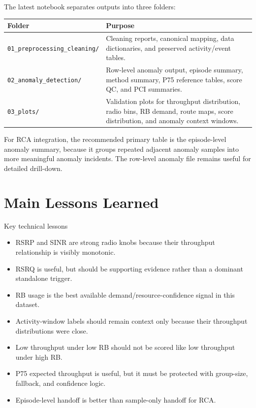 \documentclass[12pt,a4paper]{article}
\newcommand{\fname}[1]{\texttt{#1}}
\begin{document}
The latest notebook separates outputs into three folders:
\begin{center}
\begin{tabularx}{\textwidth}{L{0.34\textwidth}Y}
\toprule
\textbf{Folder} & \textbf{Purpose} \\
\midrule
\fname{01\_preprocessing\_cleaning/} & Cleaning reports, canonical mapping, data dictionaries, and preserved activity/event tables. \\
\fname{02\_anomaly\_detection/} & Row-level anomaly output, episode summary, method summary, P75 reference tables, score QC, and PCI summaries. \\
\fname{03\_plots/} & Validation plots for throughput distribution, radio bins, RB demand, route maps, score distribution, and anomaly context windows. \\
\bottomrule
\end{tabularx}
\end{center}

For RCA integration, the recommended primary table is the episode-level anomaly summary, because it groups repeated adjacent anomaly samples into more meaningful anomaly incidents. The row-level anomaly file remains useful for detailed drill-down.

\section{Main Lessons Learned}

\begin{successbox}{Key technical lessons}
\begin{itemize}
    \item RSRP and SINR are strong radio knobs because their throughput relationship is visibly monotonic.
    \item RSRQ is useful, but should be supporting evidence rather than a dominant standalone trigger.
    \item RB usage is the best available demand/resource-confidence signal in this dataset.
    \item Activity-window labels should remain context only because their throughput distributions were close.
    \item Low throughput under low RB should not be scored like low throughput under high RB.
    \item P75 expected throughput is useful, but it must be protected with group-size, fallback, and confidence logic.
    \item Episode-level handoff is better than sample-only handoff for RCA.
\end{itemize}
\end{successbox}
\end{document}
